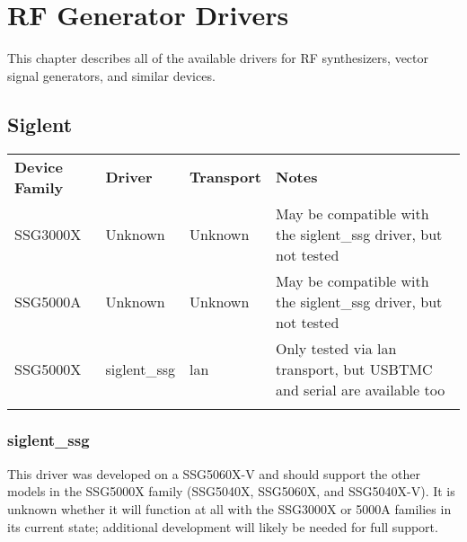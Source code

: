 \chapter{RF Generator Drivers}
\label{sec:rfgen-drivers}

This chapter describes all of the available drivers for RF synthesizers, vector signal generators, and similar devices.

\section{Siglent}

\begin{tabularx}{16cm}{lllX}
\thickhline
\textbf{Device Family} & \textbf{Driver} & \textbf{Transport} & \textbf{Notes} \\
\thickhline
SSG3000X & Unknown & Unknown & May be compatible with the siglent\_ssg driver, but not tested\\
\thinhline
SSG5000A & Unknown & Unknown & May be compatible with the siglent\_ssg driver, but not tested\\
\thinhline
SSG5000X & siglent\_ssg & lan & Only tested via lan transport, but USBTMC and serial are available too\\
\thickhline
\end{tabularx}

\subsection{siglent\_ssg}

This driver was developed on a SSG5060X-V and should support the other models in the SSG5000X family (SSG5040X,
SSG5060X, and SSG5040X-V). It is unknown whether it will function at all with the SSG3000X or 5000A families in its
current state; additional development will likely be needed for full support.

